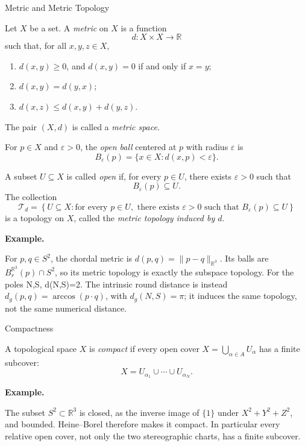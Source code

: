 \documentclass[11pt]{article}
\makeatletter
\newcommand{\R}{\mathbb R}
\newcounter{definition}
\newcommand{\exampleheading}{\par\medskip\textbf{Example.}\par\smallskip}
\newcommand{\currentdefinition}[1]{\protected@edef\@currentlabel{#1}}
\makeatother
\begin{document}
\begin{definitionbox}{Metric and Metric Topology}
\currentdefinition{\thedefinition}
\label{source:S02}


Let \(X\) be a set. A \emph{metric} on \(X\) is a function
\[
d\colon X\times X\to\mathbb{R}
\]
such that, for all \(x,y,z\in X\),

\begin{enumerate}[label=(\alph*), leftmargin=*, itemsep=.35em]
    \item \(d(x,y)\geq 0\), and \(d(x,y)=0\) if and only if \(x=y\);
    \item \(d(x,y)=d(y,x)\);
    \item \(d(x,z)\leq d(x,y)+d(y,z)\).
\end{enumerate}

The pair \((X,d)\) is called a \emph{metric space}. 

For \(p\in X\) and
\(\varepsilon>0\), the \emph{open ball} centered at \(p\) with radius
\(\varepsilon\) is
\[
B_{\varepsilon}(p)
=
\{x\in X:d(x,p)<\varepsilon\}.
\]

A subset \(U\subseteq X\) is called \emph{open} if, for every \(p\in U\),
there exists \(\varepsilon>0\) such that
\[
B_{\varepsilon}(p)\subseteq U.
\]
The collection
\[
\mathcal{T}_d
=
\left\{
U\subseteq X:
\text{for every }p\in U,\text{ there exists }\varepsilon>0
\text{ such that }B_{\varepsilon}(p)\subseteq U
\right\}
\]
is a topology on \(X\), called the \emph{metric topology induced by \(d\)}.


\exampleheading
For $p,q\in S^2$, the chordal metric is $d(p,q)=\|p-q\|_{\R^3}$. Its balls are $B_r^{\R^3}(p)\cap S^2$, so its metric topology is exactly the subspace topology. For the poles N,S, d(N,S)=2. The intrinsic round distance is instead $d_g(p,q)=\arccos(p\cdot q)$, with $d_g(N,S)=\pi$; it induces the same topology, not the same numerical distance.
\end{definitionbox}

\begin{definitionbox}{Compactness}
\currentdefinition{\thedefinition}
\label{source:S03}

A topological space $X$ is \emph{compact} if every open cover
$X=\bigcup_{\alpha\in A}U_\alpha$ has a finite subcover:
\[
X=U_{\alpha_1}\cup\cdots\cup U_{\alpha_N}.
\]


\exampleheading
The subset $S^2\subset\R^3$ is closed, as the inverse image of $\{1\}$ under $X^2+Y^2+Z^2$, and bounded. Heine--Borel therefore makes it compact. In particular every relative open cover, not only the two stereographic charts, has a finite subcover.
\end{definitionbox}
\end{document}

